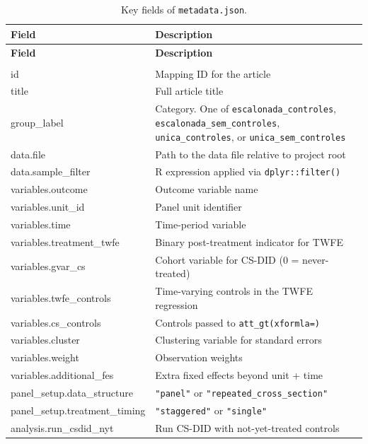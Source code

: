 \begin{longtable}{>{\ttfamily\footnotesize\raggedright}p{6.0cm} >{\small\raggedright\arraybackslash}p{9.0cm}}
\caption{Key fields of \texttt{metadata.json}.} \label{tab:metadata_fields} \\
\toprule
\textnormal{\textbf{Field}} & \textbf{Description} \\
\midrule
\endfirsthead
\toprule
\textnormal{\textbf{Field}} & \textbf{Description} \\
\midrule
\endhead
\midrule
\multicolumn{2}{r}{\footnotesize\itshape Continued on next page} \\
\endfoot
\bottomrule
\endlastfoot

id & Mapping ID for the article \\
title & Full article title \\
group\_label & Category. One of \texttt{escalonada\_controles}, \texttt{escalonada\_sem\_controles}, \texttt{unica\_controles}, or \texttt{unica\_sem\_controles} \\
data.file & Path to the data file relative to project root \\
data.sample\_filter & R expression applied via \texttt{dplyr::filter()} \\[3pt]
variables.outcome & Outcome variable name \\
variables.unit\_id & Panel unit identifier \\
variables.time & Time-period variable \\
variables.treatment\_twfe & Binary post-treatment indicator for TWFE \\
variables.gvar\_cs & Cohort variable for CS-DID (0 = never-treated) \\
variables.twfe\_controls & Time-varying controls in the TWFE regression \\
variables.cs\_controls & Controls passed to \texttt{att\_gt(xformla=)} \\
variables.cluster & Clustering variable for standard errors \\
variables.weight & Observation weights \\
variables.additional\_fes & Extra fixed effects beyond unit + time \\[3pt]
panel\_setup.data\_structure & \texttt{"panel"} or \texttt{"repeated\_cross\_section"} \\
panel\_setup.treatment\_timing & \texttt{"staggered"} or \texttt{"single"} \\[3pt]
analysis.run\_csdid\_nyt & Run CS-DID with not-yet-treated controls \\

\end{longtable}
